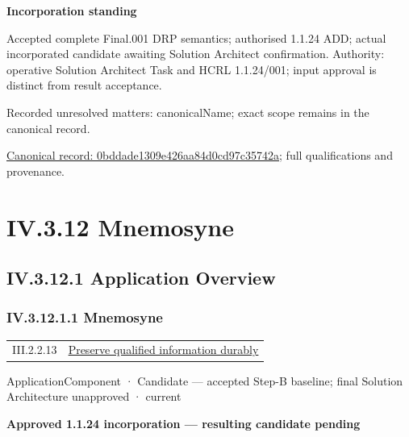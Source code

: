 \par\medskip\textbf{Incorporation standing}\par


Accepted complete Final.001 DRP semantics; authorised 1.1.24 ADD; actual incorporated candidate awaiting Solution Architect confirmation. Authority: operative Solution Architect Task and HCRL 1.1.24/001; input approval is distinct from result acceptance.


{\small Recorded unresolved matters: canonicalName; exact scope remains in the canonical record.}\par
{\footnotesize \href{../../../../continuum/application/application-function/0bddade1309e426aa84d0cd97c35742a.md}{Canonical record: 0bddade1309e426aa84d0cd97c35742a}; full qualifications and provenance.}\par
\section*{IV.3.12 Mnemosyne}
\label{navigation:IV.3.12}

\subsection*{IV.3.12.1 Application Overview}
\label{navigation:IV.3.12.1}

\subsubsection*{IV.3.12.1.1 Mnemosyne}
\label{navigation:IV.3.12.1.1}

\begin{longtable}{p{.22\linewidth}p{.73\linewidth}}
III.2.2.13 & \hyperref[element:e07ef0bcd9444af3a22ab45bbb3afc38]{Preserve qualified information durably} \\
\end{longtable}
\label{element:7985e647bf9e4ca3ba70faf9e3e4ae02}
{\small ApplicationComponent · Candidate — accepted Step-B baseline; final Solution Architecture unapproved · current}\par

\par\medskip\textbf{Approved 1.1.24 incorporation — resulting candidate pending}\par


